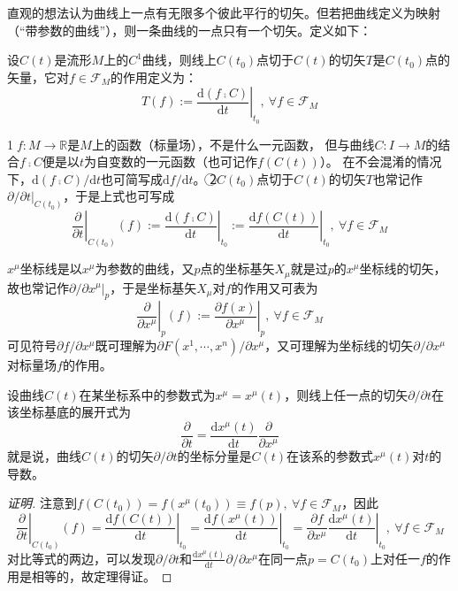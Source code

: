直观的想法认为曲线上一点有无限多个彼此平行的切矢。但若把曲线定义为映射（``带参数的曲线''），则一条曲线的一点只有一个切矢。定义如下：

\begin{definition}
设$C(t)$是流形$M$上的$C^1$曲线，则线上$C(t_0)$点切于$C(t)$的切矢$T$是$C(t_0)$点的矢量，它对$f \in \mathscr{F}_M$的作用定义为：
$$T(f) := \left.\frac{\mathrm{d}(f \comp C)}{\mathrm{d}t}\right|_{t_0}, ~ \forall f \in \mathscr{F}_M$$
\end{definition}

\begin{note}
\textcircled{1}$f \colon M \to \mathbb{R}$是$M$上的函数（标量场），不是什么一元函数，
但与曲线$C \colon I \to M$的结合$f \comp C$便是以$t$为自变数的一元函数（也可记作$f(C(t))$）。
在不会混淆的情况下，$\mathrm{d}(f \comp C) / \mathrm{d}t$也可简写成$\mathrm{d}f / \mathrm{d}t$。
\textcircled{2}$C(t_0)$点切于$C(t)$的切矢$T$也常记作$\partial / \partial t|_{C(t_0)}$，于是上式也可写成
$$\left.\frac{\partial}{\partial t}\right|_{C(t_0)}(f) := \left.\frac{\mathrm{d}(f \comp C)}{\mathrm{d}t}\right|_{t_0} := \left.\frac{\mathrm{d}f(C(t))}{\mathrm{d}t}\right|_{t_0}, ~ \forall f \in \mathscr{F}_M$$
\end{note}

\begin{example}
$x^\mu$坐标线是以$x^\mu$为参数的曲线，又$p$点的坐标基矢$X_\mu$就是过$p$的$x^\mu$坐标线的切矢，故也常记作$\partial / \partial x^\mu|_p$，于是坐标基矢$X_\mu$对$f$的作用又可表为
$$\left.\frac{\partial}{\partial x^\mu}\right|_p(f) := \left.\frac{\partial f(x)}{\partial x^\mu}\right|_p, ~ \forall f \in \mathscr{F}_M$$
可见符号$\partial f / \partial x^\mu$既可理解为$\partial F(x^1, \cdots, x^n) / \partial x^\mu$，又可理解为坐标线的切矢$\partial / \partial x^\mu$对标量场$f$的作用。
\end{example}

\begin{theorem}
设曲线$C(t)$在某坐标系中的参数式为$x^\mu = x^\mu(t)$，则线上任一点的切矢$\partial / \partial t$在该坐标基底的展开式为
$$\frac{\partial}{\partial t} = \frac{\mathrm{d}x^\mu(t)}{\mathrm{d}t}\frac{\partial}{\partial x^\mu}$$
就是说，曲线$C(t)$的切矢$\partial / \partial t$的坐标分量是$C(t)$在该系的参数式$x^\mu(t)$对$t$的导数。
\end{theorem}

\begin{proof}[证明]
注意到$f(C(t_0)) = f(x^\mu(t_0)) \equiv f(p), ~ \forall f \in \mathscr{F}_M$，因此
$$\left.\frac{\partial}{\partial t}\right|_{C(t_0)}(f) = \left.\frac{\mathrm{d}f(C(t))}{\mathrm{d}t}\right|_{t_0}
= \left.\frac{\mathrm{d}f(x^\mu(t))}{\mathrm{d}t}\right|_{t_0} = \left.\frac{\partial f}{\partial x^\mu}\frac{\mathrm{d}x^\mu(t)}{\mathrm{d}t}\right|_{t_0}, ~ \forall f \in \mathscr{F}_M$$
对比等式的两边，可以发现$\partial / \partial t$和$\frac{\mathrm{d}x^\mu(t)}{\mathrm{d}t}\partial / \partial x^\mu$在同一点$p = C(t_0)$上对任一$f$的作用是相等的，故定理得证。
\end{proof}

